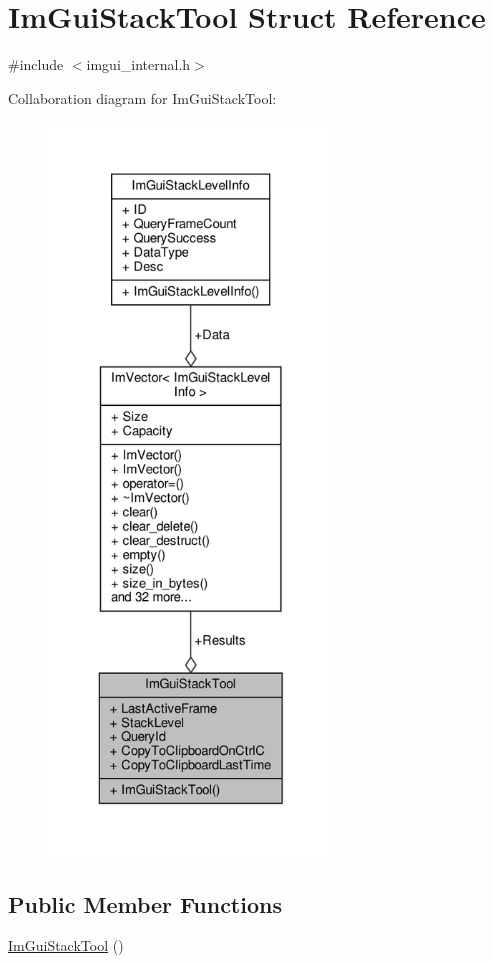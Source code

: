 \hypertarget{structImGuiStackTool}{}\section{Im\+Gui\+Stack\+Tool Struct Reference}
\label{structImGuiStackTool}


{\ttfamily \#include $<$imgui\+\_\+internal.\+h$>$}



Collaboration diagram for Im\+Gui\+Stack\+Tool\+:
\nopagebreak
\begin{figure}[H]
\begin{center}
\leavevmode
\includegraphics[height=550pt]{structImGuiStackTool__coll__graph}
\end{center}
\end{figure}
\subsection*{Public Member Functions}
\begin{DoxyCompactItemize}
\item 
\hyperlink{structImGuiStackTool_a5bcd4f8d4df227eded3dc15e4fdf222c}{Im\+Gui\+Stack\+Tool} ()
\end{DoxyCompactItemize}
